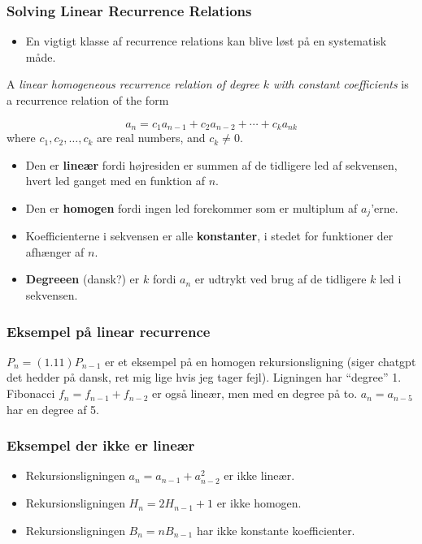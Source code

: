 \documentclass{beamer}
\begin{document}
\begin{frame}[allowframebreaks]
  \frametitle{Solving Linear Recurrence Relations}
  \begin{itemize}
  \item En vigtigt klasse af recurrence relations kan blive løst på en systematisk måde. 
  \end{itemize}
  \begin{definition}
    A \textit{linear homogeneous recurrence relation of degree $k$ with constant coefficients} is a recurrence relation of the form

    \[ a_{n} = c_{1}a_{n-1} + c_{2}a_{n-2} + \cdots + c_{k}a_{nk} \]
    where $c_{1}, c_{2}, \ldots, c_{k}$ are real numbers, and $c_{k} \neq 0$.
  \end{definition}
  \begin{itemize}
  \item Den er \textbf{lineær} fordi højresiden er summen af de tidligere led af sekvensen, hvert led ganget med en funktion af $n$. 
  \item Den er \textbf{homogen} fordi ingen led forekommer som er multiplum af $a_{j}$'erne. 
  \item Koefficienterne i sekvensen er alle \textbf{konstanter}, i stedet for funktioner der afhænger af $n$.
  \item \textbf{Degreeen} (dansk?) er $k$ fordi $a_{n}$ er udtrykt ved brug af de tidligere $k$  led i sekvensen. 
  \end{itemize}
\end{frame}

\begin{frame}
  \frametitle{Eksempel på linear recurrence}
  $P_{n} = (1.11)P_{n-1}$ er et eksempel på en homogen rekursionsligning (siger chatgpt det hedder på dansk, ret mig lige hvis jeg tager fejl). Ligningen har ``degree'' 1.
  Fibonacci $f_{n} = f_{n-1} + f_{n-2}$ er også lineær, men med en degree på to.
  $a_{n} = a_{n-5}$ har en degree af 5.
\end{frame}

\begin{frame}
  \frametitle{Eksempel der ikke er lineær}
  \begin{itemize}
  \item Rekursionsligningen $a_{n} = a_{n-1} + a^{2}_{n-2}$  er ikke lineær.
  \item Rekursionsligningen $H_{n} = 2H_{n-1} + 1$ er ikke homogen.
  \item Rekursionsligningen $B_{n} = nB_{n-1}$ har ikke konstante koefficienter. 
  \end{itemize}
\end{frame}
\end{document}
